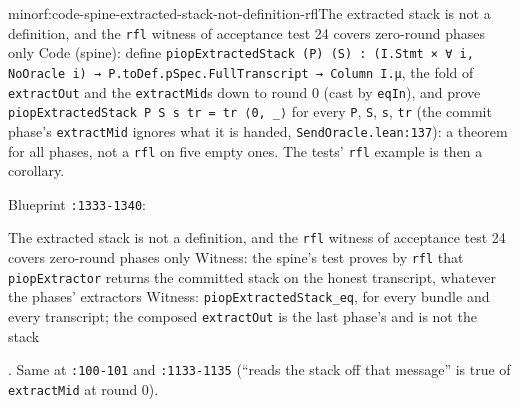 \begin{finding}{minor}{f:code-spine-extracted-stack-not-definition-rfl}{The extracted stack is not a definition, and the \texttt{rfl} witness of acceptance test 24 covers zero-round phases only}
Code (spine): define \texttt{p\allowbreak{}i\allowbreak{}o\allowbreak{}p\allowbreak{}E\allowbreak{}x\allowbreak{}t\allowbreak{}r\allowbreak{}a\allowbreak{}c\allowbreak{}t\allowbreak{}e\allowbreak{}d\allowbreak{}S\allowbreak{}t\allowbreak{}a\allowbreak{}c\allowbreak{}k\allowbreak{} (\allowbreak{}P\allowbreak{})\allowbreak{} (\allowbreak{}S\allowbreak{})\allowbreak{} :\allowbreak{} (\allowbreak{}I\allowbreak{}.\allowbreak{}S\allowbreak{}t\allowbreak{}m\allowbreak{}t\allowbreak{} ×\allowbreak{} ∀\allowbreak{} i\allowbreak{},\allowbreak{} N\allowbreak{}o\allowbreak{}O\allowbreak{}r\allowbreak{}a\allowbreak{}c\allowbreak{}l\allowbreak{}e\allowbreak{} i\allowbreak{})\allowbreak{} →\allowbreak{} P\allowbreak{}.\allowbreak{}t\allowbreak{}o\allowbreak{}D\allowbreak{}e\allowbreak{}f\allowbreak{}.\allowbreak{}p\allowbreak{}S\allowbreak{}p\allowbreak{}e\allowbreak{}c\allowbreak{}.\allowbreak{}F\allowbreak{}u\allowbreak{}l\allowbreak{}l\allowbreak{}T\allowbreak{}r\allowbreak{}a\allowbreak{}n\allowbreak{}s\allowbreak{}c\allowbreak{}r\allowbreak{}i\allowbreak{}p\allowbreak{}t\allowbreak{} →\allowbreak{} C\allowbreak{}o\allowbreak{}l\allowbreak{}u\allowbreak{}m\allowbreak{}n\allowbreak{} I\allowbreak{}.\allowbreak{}μ}, the fold of \texttt{extractOut} and the \texttt{extractMid}s down to round 0 (cast by \texttt{eqIn}), and prove \texttt{p\allowbreak{}i\allowbreak{}o\allowbreak{}p\allowbreak{}E\allowbreak{}x\allowbreak{}t\allowbreak{}r\allowbreak{}a\allowbreak{}c\allowbreak{}t\allowbreak{}e\allowbreak{}d\allowbreak{}S\allowbreak{}t\allowbreak{}a\allowbreak{}c\allowbreak{}k\allowbreak{} P\allowbreak{} S\allowbreak{} s\allowbreak{} t\allowbreak{}r\allowbreak{} =\allowbreak{} t\allowbreak{}r\allowbreak{} ⟨\allowbreak{}0\allowbreak{},\allowbreak{} \_\allowbreak{}⟩} for every \texttt{P}, \texttt{S}, \texttt{s}, \texttt{tr} (the commit phase's \texttt{extractMid} ignores what it is handed, \texttt{SendOracle.\allowbreak{}lean:137}): a theorem for all phases, not a \texttt{rfl} on five empty ones. The tests' \texttt{rfl} example is then a corollary.

Blueprint \texttt{:1333-{}1340}:

\begin{change}{The extracted stack is not a definition, and the \texttt{rfl} witness of acceptance test 24 covers zero-round phases only}
\asis Witness: the spine's test proves by \texttt{rfl} that
\texttt{piopExtractor} returns the committed stack on the honest transcript, whatever the phases'
extractors
\asproposed Witness: \texttt{piopExtractedStack\_\allowbreak{}eq}, for every bundle and every transcript; the
composed \texttt{extractOut} is the last phase's and is not the stack
\end{change}
. Same at \texttt{:100-{}101} and \texttt{:1133-{}1135} (\enquote{reads the stack off that message} is true of \texttt{extractMid} at round 0).


\end{finding}

